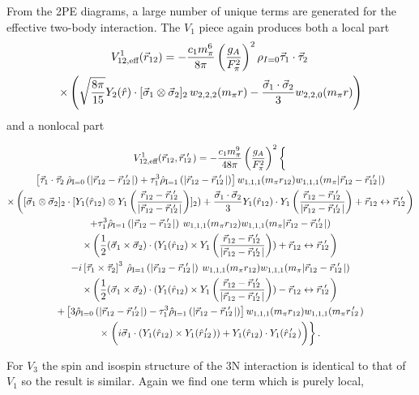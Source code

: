 From the 2PE diagrams, a large number of unique terms are generated for the effective two-body interaction. The $V_1$ piece again produces both a local part 
\begin{multline}
V^{1}_{12,\text{eff}}(\vec{r}_{12})=-\frac{c_1 m_\pi^6}{8\pi}\left(\frac{g_A}{F_\pi^2}\right)^2 \rho_{I=0}\vec{\tau}_1\cdot\vec{\tau}_2\:\\
 \times\left(\sqrt{\frac{8\pi}{15}}Y_2(\hat{r})\cdot[\vec{\sigma}_1\otimes\vec{\sigma}_2]_2 \, w_{2,2,2}(m_\pi r) -\frac{\vec{\sigma}_1\cdot\vec{\sigma}_2}{3}  w_{2,2,0}(m_\pi r) \right)
\end{multline}
and a nonlocal part 

\begin{multline}
V^{1}_{12,\text{eff}}(\rot,\rotp)=-\frac{c_1 m_\pi^9}{48\pi} \left(\frac{g_A}{F_\pi^2}\right)^2 
\left\{ \fracphantom \right. \\
\left[ \taudot \: \rhohat{0}{|\rot-\rotp|} + \tau_1^3 \rhohat{1}{|\rot-\rotp|} \right] \w{1}{1}{1}{ m_\pi r_{12}}\w{1}{1}{1}{ m_\pi | \rot-\rotp | } \\
\times \left( \sigmatwo \cdot [ Y_1 (\hat{r}_{12}) \otimes Y_1 \left(\frac{\rot-\rotp}{|\rot-\rotp|}\right) ]_2
 )  
 +\frac{\sigmadot}{3} Y_1 (\hat{r}_{12}) \cdot Y_1 \left(\frac{\rot-\rotp}{|\rot-\rotp|}\right)
+\rot\leftrightarrow\rotp\right) \\
%
+ \tau_1^3 \rhohat{1}{|\rot-\rotp|} \: \w{1}{1}{1}{m_\pi r_{12}} \w{1}{1}{1}{m_\pi | \rot-\rotp | } \\ 
\times \left(\fracphantom
\frac{1}{2}(\sigmacross)\cdot (Y_1 (\hat{r}_{12}) \times Y_1 \left(\frac{\rot-\rotp}{|\rot-\rotp|}\right) )+\rot\leftrightarrow\rotp\right) \\ 
%
- i \taucrossthree\: \rhohat{1}{|\rot-\rotp|} \: \w{1}{1}{1}{ m_\pi r_{12}}\w{1}{1}{1}{m_\pi | \rot-\rotp | }  \\
\times\left(\fracphantom
\frac{1}{2}(\sigmacross)\cdot (Y_1 (\hat{r}_{12}) \times Y_1 \left(\frac{\rot-\rotp}{|\rot-\rotp|}\right))-\rot\leftrightarrow\rotp\right) \\
%
+\left[3\rhohat{0}{|\rot-\rotp|}-\tau_1^3\rhohat{1}{|\rot-\rotp|}\right]\w{1}{1}{1}{ m_\pi r_{12}}\w{1}{1}{1}{m_\pi \rotpr} \\
\times\left.\left(i\vec{\sigma}_1 \cdot (Y_1 (\hat{r}_{12}) \times Y_1(\rotphat)) + Y_1 (\hat{r}_{12}) \cdot Y_1(\rotphat) \fracphantom \right)
\right\}.
\end{multline}

% 

For $V_3$ the spin and isospin structure of the 3N interaction is identical to that of $V_1$ so the result is similar. Again we find one term which is purely local,

